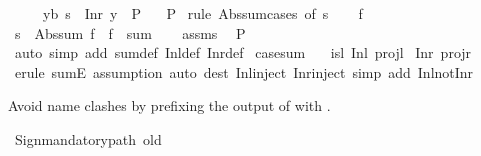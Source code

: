 \begin{isabellebody}
\ \ \ \ \ {\isachardoublequoteopen}{\isasymAnd}y{\isacharcolon}{\kern0pt}{\isacharcolon}{\kern0pt}{\isacharprime}{\kern0pt}b{\isachardot}{\kern0pt}\ s\ {\isacharequal}{\kern0pt}\ Inr\ y\ {\isasymLongrightarrow}\ P{\isachardoublequoteclose}\isanewline
\ \ \ P\isanewline
%
\isadelimproof
%
\endisadelimproof
%
\isatagproof
{}\isamarkupfalse%
\ {\isacharparenleft}{\kern0pt}rule\ Abs{\isacharunderscore}{\kern0pt}sum{\isacharunderscore}{\kern0pt}cases\ {\isacharbrackleft}{\kern0pt}of\ s{\isacharbrackright}{\kern0pt}{\isacharparenright}{\kern0pt}\isanewline
\ \ \isamarkupfalse%
\ f\isanewline
\ \ \isamarkupfalse%
\ {\isachardoublequoteopen}s\ {\isacharequal}{\kern0pt}\ Abs{\isacharunderscore}{\kern0pt}sum\ f{\isachardoublequoteclose}\ \ {\isachardoublequoteopen}f\ {\isasymin}\ sum{\isachardoublequoteclose}\isanewline
\ \ \isamarkupfalse%
\ assms\ \isamarkupfalse%
\ P\isanewline
\ \ \ \ \isamarkupfalse%
\ {\isacharparenleft}{\kern0pt}auto\ simp\ add{\isacharcolon}{\kern0pt}\ sum{\isacharunderscore}{\kern0pt}def\ Inl{\isacharunderscore}{\kern0pt}def\ Inr{\isacharunderscore}{\kern0pt}def{\isacharparenright}{\kern0pt}\isanewline
{}\isamarkupfalse%
%
\endisatagproof
{\isafoldproof}%
%
\isadelimproof
\isanewline
%
\endisadelimproof
\isanewline
{}\isamarkupfalse%
\ case{\isacharunderscore}{\kern0pt}sum\ \isanewline
\ \ isl{\isacharcolon}{\kern0pt}\ Inl\ projl\isanewline
{\isacharbar}{\kern0pt}\ Inr\ projr\isanewline
%
\isadelimproof
\ \ %
\endisadelimproof
%
\isatagproof
{}\isamarkupfalse%
\ {\isacharparenleft}{\kern0pt}erule\ sumE{\isacharcomma}{\kern0pt}\ assumption{\isacharparenright}{\kern0pt}\ {\isacharparenleft}{\kern0pt}auto\ dest{\isacharcolon}{\kern0pt}\ Inl{\isacharunderscore}{\kern0pt}inject\ Inr{\isacharunderscore}{\kern0pt}inject\ simp\ add{\isacharcolon}{\kern0pt}\ Inl{\isacharunderscore}{\kern0pt}not{\isacharunderscore}{\kern0pt}Inr{\isacharparenright}{\kern0pt}%
\endisatagproof
{\isafoldproof}%
%
\isadelimproof
%
\endisadelimproof
%
\begin{isamarkuptext}%
Avoid name clashes by prefixing the output of  with .%
\end{isamarkuptext}\isamarkuptrue%
%
\isadelimML
%
\endisadelimML
%
\isatagML
{}\isamarkupfalse%
\ {\isacartoucheopen}Sign{\isachardot}{\kern0pt}mandatory{\isacharunderscore}{\kern0pt}path\ {\isachardoublequote}{\kern0pt}old{\isachardoublequote}{\kern0pt}{\isacartoucheclose}%

\end{isabellebody}

